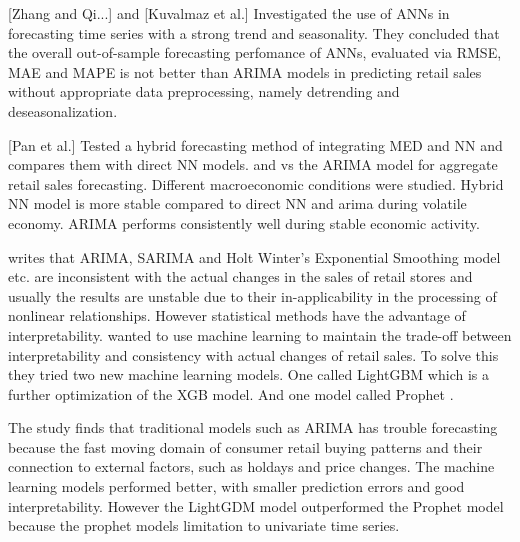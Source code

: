 [Zhang and Qi...] and [Kuvalmaz et al.]
Investigated the use of ANNs in forecasting time series with a strong trend and seasonality.
They concluded that the overall out-of-sample forecasting perfomance of ANNs, 
evaluated via RMSE, MAE and MAPE is not better than ARIMA models in predicting
retail sales without appropriate data preprocessing,
namely detrending and deseasonalization.

[Pan et al.]
Tested a hybrid forecasting method of integrating MED and NN and compares them with direct NN models.
and vs the ARIMA model for aggregate retail sales forecasting.
Different macroeconomic conditions were studied.
Hybrid NN model is more stable compared to direct NN and arima during volatile economy.
ARIMA performs consistently well during stable economic activity.


\cite{Weng2020} writes that ARIMA, SARIMA and Holt Winter's
Exponential Smoothing model etc. are inconsistent with the actual changes in the sales
of retail stores and usually the results are unstable due to their in-applicability
in the processing of nonlinear relationships.
However statistical methods have the advantage of interpretability.
\cite{Bowen2020} wanted to use machine learning to maintain
the trade-off between interpretability and consistency with actual
changes of retail sales.
To solve this they tried two new machine learning models.
One called LightGBM which is a further optimization of the XGB model.
And one model called Prophet \citep{Zunic2020}.

The study finds that traditional models such as ARIMA has trouble forecasting
because the fast moving domain of consumer retail buying patterns and 
their connection to external factors, such as holdays and price changes.
The machine learning models performed better, with smaller prediction errors
and good interpretability.
However the LightGDM model outperformed the Prophet model because the prophet
models limitation to univariate time series.

%
%


